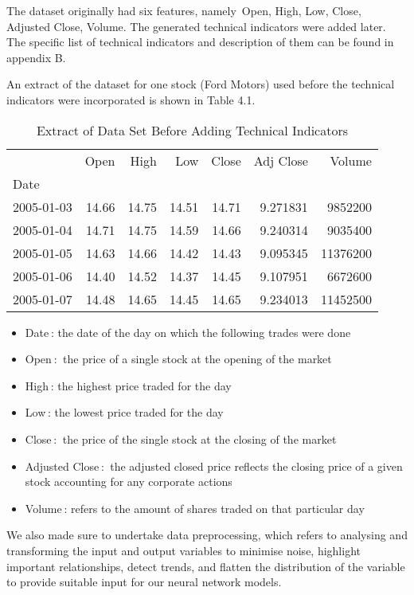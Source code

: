 The dataset originally had six features, namely Open, High, Low, Close, Adjusted Close, Volume. The generated technical indicators were added later. The specific list of technical indicators and description of them can be found in appendix B.

An extract of the dataset for one stock (Ford Motors) used before the technical indicators were incorporated is shown in Table 4.1.

\begin{table}[h]
\centering
\begin{tabular}{lrrrrrr}
\toprule
{} &   Open &   High &    Low &  Close &  Adj Close &    Volume \\
Date       &        &        &        &        &            &           \\
\midrule
2005-01-03 &  14.66 &  14.75 &  14.51 &  14.71 &   9.271831 &   9852200 \\
2005-01-04 &  14.71 &  14.75 &  14.59 &  14.66 &   9.240314 &   9035400 \\
2005-01-05 &  14.63 &  14.66 &  14.42 &  14.43 &   9.095345 &  11376200 \\
2005-01-06 &  14.40 &  14.52 &  14.37 &  14.45 &   9.107951 &   6672600 \\
2005-01-07 &  14.48 &  14.65 &  14.45 &  14.65 &   9.234013 &  11452500 \\
\bottomrule
\end{tabular}
\caption{Extract of Data Set Before Adding Technical Indicators}
\end{table}

\begin{itemize}
\item Date : the date of the day on which the following trades were done
\item Open :  the price of a single stock at the opening of the market
 \item High : the highest price traded for the day
\item Low : the lowest price traded for the day
\item Close :  the price of the single stock at the closing of the market
\item Adjusted Close :  the adjusted closed price reflects the closing price of a given stock accounting for any corporate actions
\item Volume : refers to the amount of shares traded on that particular day
\end{itemize}

We also made sure to undertake data preprocessing, which refers to analysing and transforming the input and output variables to minimise noise, highlight important relationships, detect trends, and flatten the distribution of the variable to provide suitable input for our neural network models.

